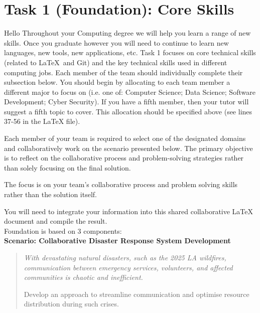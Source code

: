 \documentclass[a4paper, 11pt]{report}
\begin{document}

\tableofcontents





\newpage
\section{Task 1 (Foundation): Core Skills}
Hello
Throughout your Computing degree we will help you learn a range of new skills. Once you graduate however you will need to continue to learn new languages, new tools, new applications, etc. Task 1 focuses on core technical skills (related to \LaTeX\ and Git) and the key technical skills used in different computing jobs. Each member of the team should individually complete their subsection below. You should begin by allocating to each team member a different major to focus on (i.e. one of: Computer Science; Data Science; Software Development; Cyber Security). If you have a fifth member, then your tutor will suggest a fifth topic to cover. This allocation should be specified above (see lines 37-56 in the LaTeX file).

Each member of your team is required to select one of the designated domains and collaboratively work on the scenario presented below. The primary objective is to reflect on the collaborative process and problem-solving strategies rather than solely focusing on the final solution.

The focus is on your team’s collaborative process and problem solving skills rather than the solution itself. 

You will need to integrate your information into this shared collaborative LaTeX document and compile the result.\\[2mm]

Foundation is based on 3 components:\\[1mm]

\textbf{Scenario: Collaborative Disaster Response System Development}

{\begin{quote}\itshape
With devastating natural disasters, such as the 2025 LA wildfires, communication between emergency services, volunteers, and affected communities is chaotic and inefficient.

Develop an approach to streamline communication and optimise resource distribution during such crises. 
\end{quote}}
\end{document}
